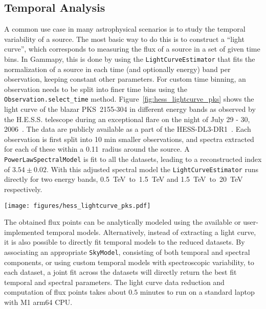 \documentclass[longauth]{aa}
\newcommand{\code}[1]{\texttt{#1}}
\newcommand{\gammapy}{Gammapy\xspace}
\newcommand{\hess}{H.E.S.S.\xspace}
\begin{document}
\subsection{Temporal Analysis}
\label{ssec:temporal-analysis}
A common use case in many astrophysical scenarios is to study the temporal
variability of a source. The most basic way to do this is to construct a
\enquote{light curve}, which corresponds to measuring the flux of a source
in a set of given time bins. In \gammapy, this
is done by using the \code{LightCurveEstimator} that fits the normalization of a
source in each time (and optionally energy) band per observation, keeping constant
other parameters.
For custom time binning, an observation needs to be split into finer time bins using
the \code{Observation.select\_time} method. Figure~\ref{fig:hess_lightcurve_pks}
shows the light curve of the blazar PKS~2155-304 in different energy bands as
observed by the \hess telescope during an exceptional flare on the night of
July 29 - 30, 2006~\cite{2009A&A...502..749A}. The data are publicly available 
as a part of the HESS-DL3-DR1~\cite{HESS_DR1}. Each observation is first split into 10 min smaller
observations, and spectra extracted for each of these within a 0.11\textdegree~radius
around the source. A \code{PowerLawSpectralModel} is fit to all the datasets, leading
to a reconstructed index of $3.54 \pm 0.02$. With this adjusted spectral model
the \code{LightCurveEstimator} runs directly for two energy bands,
\SI{0.5}{TeV}~to~\SI{1.5}{TeV} and \SI{1.5}{TeV}~to~\SI{20}{TeV} respectively.
%
\begin{figure*}[t]
    \sidecaption
        \texttt{[image: figures/hess\_lightcurve\_pks.pdf]}
        \caption{
        Binned PKS~2155-304 light curve in two different energy bands
        as observed by the \hess telescopes in 2006. The colored markers
        show the flux points in the different energy bands:
                the range from (\SI{0.5}{TeV}~to~\SI{1.5}{TeV} is shown in blue, while
                the range from \SI{1.5}{TeV}~to~\SI{20}{TeV}) is shown in orange.
                The horizontal error illustrates the width of the time bin of 10~min. The vertical
        error bars show the associated asymmetrical flux errors. The marker
        is set to the center of the time bin.
    }
    \label{fig:hess_lightcurve_pks}
\end{figure*}
%
The obtained flux points can be analytically modeled using the available or
user-implemented temporal models. Alternatively, instead of  extracting a
light curve, it is also possible to directly fit temporal models to the reduced
datasets. By associating an appropriate \code{SkyModel}, consisting of both temporal
and spectral components, or using custom temporal models with spectroscopic
variability, to each dataset, a joint fit across the datasets will directly
return the best fit temporal and spectral parameters. The light curve data reduction
and computation of flux points takes about $0.5$ minutes to run on a standard laptop with M1 arm64 CPU.
\end{document}
